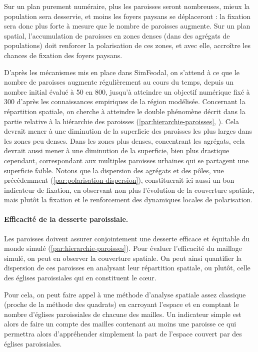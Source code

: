 Sur un plan purement numéraire, plus les paroisses seront nombreuses, mieux la population sera desservie, et moins les foyers paysans se déplaceront : la fixation sera donc plus forte à mesure que le nombre de paroisses augmente.
Sur un plan spatial, l'accumulation de paroisses en zones denses (dans des agrégats de populations) doit renforcer la polarisation de ces zones, et avec elle, accroître les chances de fixation des foyers paysans.

D'après les mécanismes mis en place dans SimFeodal, on s'attend à ce que le nombre de paroisses augmente régulièrement au cours du temps, depuis un nombre initial évalué à 50 en 800, jusqu'à atteindre un objectif numérique fixé à 300 d'après les connaissances empiriques de la région modélisée.
Concernant la répartition spatiale, on cherche à atteindre le double phénomène décrit dans la partie relative à la hiérarchie des paroisses (\cref{par:hierarchie-paroisses}, \pageref{par:hierarchie-paroisses}).
Cela devrait mener à une diminution de la superficie des paroisses les plus larges dans les zones peu denses.
Dans les zones plus denses, concentrant les agrégats, cela devrait aussi mener à une diminution de la superficie, bien plus drastique cependant, correspondant aux multiples paroisses \og urbaines\fg{} qui se partagent une superficie faible.
Notons que la dispersion des agrégats et des pôles, vue précédemment (\ref{par:polarisation-dispersion}), constituerait ici aussi un bon indicateur de fixation, en observant non plus l'évolution de la couverture spatiale, mais plutôt la fixation et le renforcement des dynamiques locales de polarisation.

\paragraph{Efficacité de la desserte paroissiale.}

Les paroisses doivent assurer conjointement une desserte efficace et équitable du monde simulé (\cref{par:hierarchie-paroisses}).
Pour évaluer l'efficacité du maillage simulé, on peut en observer la couverture spatiale.
On peut ainsi quantifier la dispersion de ces paroisses en analysant leur répartition spatiale, ou plutôt, celle des églises paroissiales qui en constituent le cœur.

Pour cela, on peut faire appel à une méthode d'analyse spatiale assez classique (proche de la méthode des quadrats) en carroyant l'espace et en comptant le nombre d'églises paroissiales de chacune des mailles.
Un indicateur simple est alors de faire un compte des mailles contenant au moins une paroisse ce qui permettra alors d'appréhender simplement la part de l'espace couvert par des églises paroissiales.

